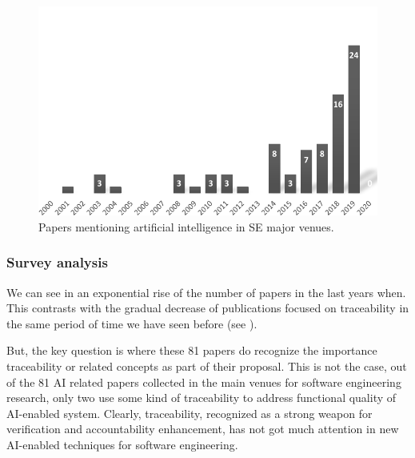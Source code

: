 
\begin{figure}[h]
		\centering
		\includegraphics[width=.6\linewidth]{images/publicationyears-aiinse}
		\caption{Papers mentioning artificial intelligence in SE major venues. }
		\label{fig:publicationyears-ai}
\end{figure}

\subsubsection{Survey analysis}
We can see in  an exponential rise of the number of papers in the last years when. This contrasts with the gradual decrease of publications focused on traceability in the same period of time we have seen before (see ).

But, the key question is where these 81 papers do recognize the importance traceability or related concepts as part of their proposal. This is not the case, out of the 81 AI related papers collected in the main venues for software engineering research, only two use some kind of traceability to address functional quality of AI-enabled system. Clearly, traceability, recognized as a strong weapon for verification and accountability enhancement, has not got much attention in new AI-enabled techniques for software engineering. 

